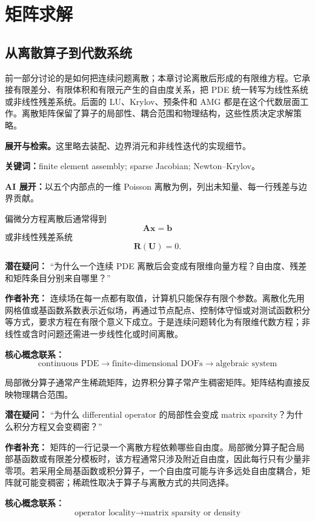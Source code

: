 \documentclass[11pt,openany]{ctexbook}
\newcommand{\studyroute}[3]{%
  \par\smallskip\noindent\textbf{展开与检索。}#1\par
  \noindent\textbf{关键词：}#2。\par
  \noindent\textbf{AI 展开：}#3\par
}
\begin{document}
\part{矩阵求解}

\chapter{从离散算子到代数系统}

\begin{chaptersummary}
前一部分讨论的是如何把连续问题离散；本章讨论离散后形成的有限维方程。它承接有限差分、有限体积和有限元产生的自由度关系，把 PDE 统一转写为线性系统或非线性残差系统。后面的 LU、Krylov、预条件和 AMG 都是在这个代数层面工作。离散矩阵保留了算子的局部性、耦合范围和物理结构，这些性质决定求解策略。
\end{chaptersummary}
\studyroute{这里略去装配、边界消元和非线性迭代的实现细节。}{finite element assembly; sparse Jacobian; Newton--Krylov}{以五个内部点的一维 Poisson 离散为例，列出未知量、每一行残差与边界贡献。}

偏微分方程离散后通常得到
\[
\bm A\bm x=\bm b
\]
或非线性残差系统
\[
\bm R(\bm U)=0.
\]

\begin{authornote}
\textbf{潜在疑问：}
“为什么一个连续 PDE 离散后会变成有限维向量方程？自由度、残差和矩阵条目分别来自哪里？”

\textbf{作者补充：}
连续场在每一点都有取值，计算机只能保存有限个参数。离散化先用网格值或基函数系数表示近似场，再通过节点配点、控制体守恒或对测试函数积分等方式，要求方程在有限个意义下成立。于是连续问题转化为有限维代数方程；非线性或含时问题还需进一步线性化或时间离散。

\textbf{核心概念联系：}
\[
\text{continuous PDE}
\longrightarrow
\text{finite-dimensional DOFs}
\longrightarrow
\text{algebraic system}
\]
\end{authornote}

局部微分算子通常产生稀疏矩阵，边界积分算子常产生稠密矩阵。矩阵结构直接反映物理耦合范围。

\begin{authornote}
\textbf{潜在疑问：}
“为什么 differential operator 的局部性会变成 matrix sparsity？为什么积分方程又会变稠密？”

\textbf{作者补充：}
矩阵的一行记录一个离散方程依赖哪些自由度。局部微分算子配合局部基函数或有限差分模板时，该方程通常只涉及附近自由度，因此每行只有少量非零项。若采用全局基函数或积分算子，一个自由度可能与许多远处自由度耦合，矩阵就可能变稠密；稀疏性取决于算子与离散方式的共同选择。

\textbf{核心概念联系：}
\[
\text{operator locality}
\longrightarrow
\text{matrix sparsity or density}
\]
\end{authornote}
\end{document}
